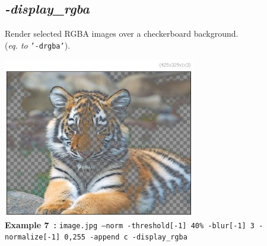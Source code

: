 \documentclass[a4paper,11pt,twoside]{book}
\begin{document}
\subsection{\emph{-display\_rgba} }\vspace*{-0.5em}
Render selected RGBA images over a checkerboard background.
~\\(\emph{eq. to} {\small \texttt{'-drgba'}}).
\begin{center}\includegraphics[keepaspectratio=true,height=7cm,width=\textwidth]{img/gmic_def7.jpg}\\
{\footnotesize \textbf{Example 7~:} \texttt{image.jpg --norm -threshold[-1] 40\% -blur[-1] 3 -normalize[-1] 0,255 -append c -display\_rgba}}
\end{center}
\end{document}
